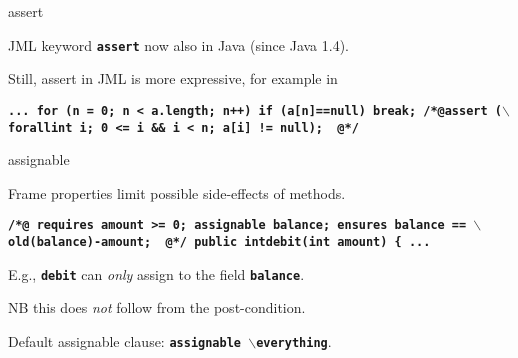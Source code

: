 \documentclass[
pdf,
nocolorBG,
slideColor,
erik,
]{prosper}
\newcommand{\code}[1]{{\rm \texttt{\textbf{\small #1}}}}
\newcommand{\old}     {\(\backslash\)old}
\newcommand{\vooralle}{\(\backslash\)forall}
\newcommand{\everything}{\(\backslash\)everything}
\newcommand{\nothing}{\(\backslash\)nothing}
\begin{document}
\begin{slide}{assert}
\vspace*{-3ex}

JML keyword \code{assert} now also in Java (since Java 1.4).

\medskip

Still, assert in JML is more expressive, for example in

\begin{alltt}
\texttt{\textbf{\small  ...
  for (n = 0; n < a.length; n++) 
       if (a[n]==null) break;
{\green /*@}{\blue assert (\vooralle int i; 0 <= i && i < n; 
                            a[i] != null);                }
  {\green @*/} }}
\end{alltt} 

\end{slide}

\begin{slide}{assignable}
\vspace*{-3ex}

{\blue Frame properties} limit possible side-effects of methods.

\begin{alltt}
\texttt{\textbf{\small {\green /*@}   requires amount >= 0;
     {\blue assignable} balance;
         ensures balance == \old(balance)-amount;
{ \green  @*/}
  public int{\green debit}(int amount) \{ 
    ...
}}
\end{alltt}
E.g., \code{debit} can {\em only} assign to the field \code{balance}.

NB this does {\em not} follow from the post-condition.

\medskip

Default assignable clause: \code{assignable \everything}.

\end{slide}

\end{document}
